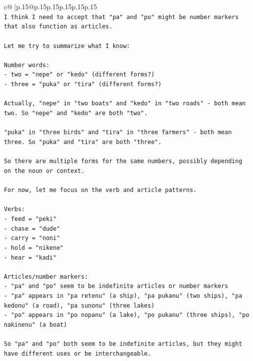 \documentclass{article}
\begin{document}
{\begin{supertabular}{c@{$\;$}|p{.15\linewidth}@{}p{.15\linewidth}p{.15\linewidth}p{.15\linewidth}p{.15\linewidth}p{.15\linewidth}}
{{{\\ 
\texttt{I think I need to accept that "pa" and "po" might be number markers that also function as articles.} \\
\\ 
\texttt{Let me try to summarize what I know:} \\
\\ 
\texttt{Number words:} \\
\texttt{{-} two = "nepe" or "kedo" (different forms?)} \\
\texttt{{-} three = "puka" or "tira" (different forms?)} \\
\\ 
\texttt{Actually, "nepe" in "two boats" and "kedo" in "two roads" {-} both mean two. So "nepe" and "kedo" are both "two".} \\
\\ 
\texttt{"puka" in "three birds" and "tira" in "three farmers" {-} both mean three. So "puka" and "tira" are both "three".} \\
\\ 
\texttt{So there are multiple forms for the same numbers, possibly depending on the noun or context.} \\
\\ 
\texttt{For now, let me focus on the verb and article patterns.} \\
\\ 
\texttt{Verbs:} \\
\texttt{{-} feed = "peki"} \\
\texttt{{-} chase = "dude"} \\
\texttt{{-} carry = "noni"} \\
\texttt{{-} hold = "nikene"} \\
\texttt{{-} hear = "kadi"} \\
\\ 
\texttt{Articles/number markers:} \\
\texttt{{-} "pa" and "po" seem to be indefinite articles or number markers} \\
\texttt{{-} "pa" appears in "pa retenu" (a ship), "pa pukanu" (two ships), "pa kedonu" (a road), "pa sunonu" (three lakes)} \\
\texttt{{-} "po" appears in "po nopanu" (a lake), "po pukanu" (three ships), "po nakinenu" (a boat)} \\
\\ 
\texttt{So "pa" and "po" both seem to be indefinite articles, but they might have different uses or be interchangeable.} \\
}}}
\end{supertabular}}
\end{document}
